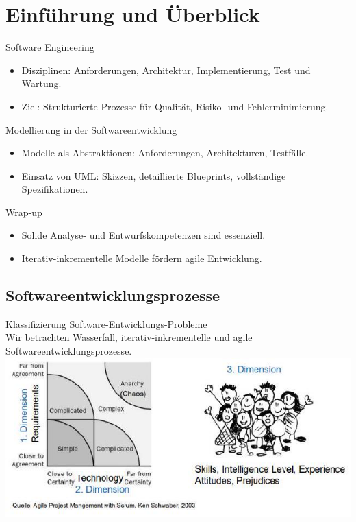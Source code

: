 \section{Einführung und Überblick}

\begin{definition}{Software Engineering}
\begin{itemize}
    \item Disziplinen: Anforderungen, Architektur, Implementierung, Test und Wartung.
    \item Ziel: Strukturierte Prozesse für Qualität, Risiko- und Fehlerminimierung.
\end{itemize}
\end{definition}

\begin{definition}{Modellierung in der Softwareentwicklung}
\begin{itemize}
    \item Modelle als Abstraktionen: Anforderungen, Architekturen, Testfälle.
    \item Einsatz von UML: Skizzen, detaillierte Blueprints, vollständige Spezifikationen.
    \end{itemize}
\end{definition}

\begin{concept}{Wrap-up}
\begin{itemize}
    \item Solide Analyse- und Entwurfskompetenzen sind essenziell.
    \item Iterativ-inkrementelle Modelle fördern agile Entwicklung.
\end{itemize}
\end{concept}

\subsection{Softwareentwicklungsprozesse}

\begin{concept}{Klassifizierung Software-Entwicklungs-Probleme}\\
  Wir betrachten Wasserfall, iterativ-inkrementelle und agile Softwareentwicklungsprozesse.\\
  \includegraphics[width=\linewidth]{images/2024_12_29_0d1d7b5551ea1b4b41bdg-01}
\end{concept}


